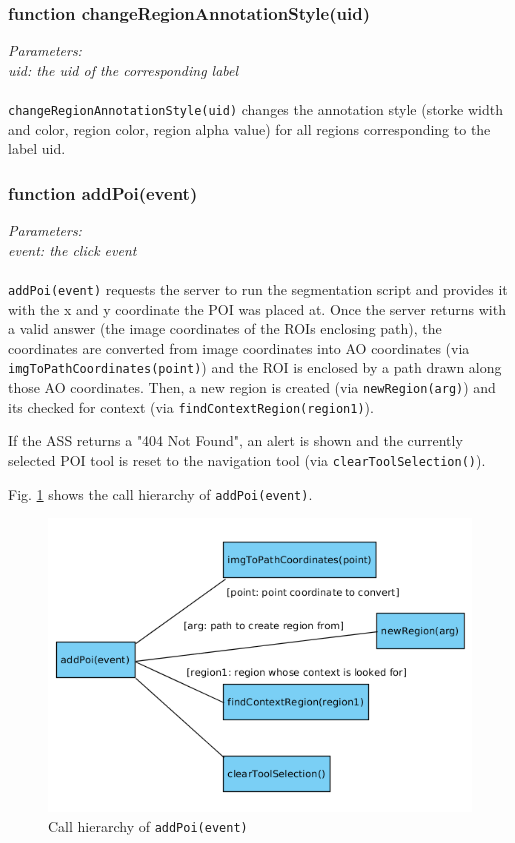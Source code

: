 \subsubsection{function changeRegionAnnotationStyle(uid)}
\emph{Parameters:\\
	uid: the uid of the corresponding label\\ \\
}
\texttt{changeRegionAnnotationStyle(uid)} changes the annotation style (storke width and color, region color, region alpha value) for all regions corresponding to the label uid.


\subsubsection{function addPoi(event)}
\emph{Parameters:\\
	event: the click event\\ \\
}
\texttt{addPoi(event)} requests the server to run the segmentation script and provides it with the x and y coordinate the POI was placed at. Once the server returns with a valid answer (the image coordinates of the ROIs enclosing path), the coordinates are converted from image coordinates into AO coordinates (via \texttt{imgToPathCoordinates(point)}) and the ROI is enclosed by a path drawn along those AO coordinates. Then, a new region is created (via \texttt{newRegion(arg)}) and its checked for context (via \texttt{findContextRegion(region1)}).

If the ASS returns a "404 Not Found", an alert is shown and the currently selected POI tool is reset to the navigation tool (via \texttt{clearToolSelection()}).

Fig. \ref{fig_Bpoi} shows the call hierarchy of \texttt{addPoi(event)}.

\begin{figure}[H]
	\begin{center}
		\includegraphics[scale=0.5]{img/ch_addPoi.png}
		\caption{Call hierarchy of \texttt{addPoi(event)}}
		\label{fig_Bpoi}
	\end{center}
\end{figure}


